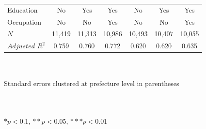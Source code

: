 \documentclass[serif, aspectratio=169]{beamer}
\begin{document}
\begin{frame}
\begin{table}[htbp]
\begin{tabular}{@{}l*{6}{c}@{}}
\midrule
Education &       No         &      Yes         &      Yes         &       No         &      Yes         &      Yes         \\
Occupation&       No         &       No         &      Yes         &       No         &       No         &      Yes         \\
$\textit{N}$&   11,419         &   11,313         &   10,986         &   10,493         &   10,407         &   10,055         \\
$\textit{Adjusted R}^2$&    0.759         &    0.760         &    0.772         &    0.620         &    0.620         &    0.635         \\
\bottomrule
\end{tabular}

\\\\{\linewidth}{\tiny Standard errors clustered at prefecture level in parentheses}\\\\
\\\\{\linewidth}{\tiny $*p<0.1$, $**p<0.05$, $***p<0.01$}\\\\


\label{table:basic_DID_Monthly_income}

\end{table}

\end{frame}

\end{document}

